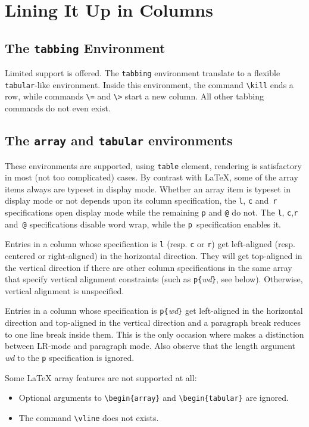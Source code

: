 \section{Lining It Up in Columns}
\subsection{The \protect\texttt{tabbing} Environment}
Limited support is offered.
The \texttt{tabbing} environment translate to a flexible \texttt{tabular}-like
environment.
Inside this environment, the command \verb+\kill+ ends a row, while
commands
\verb+\=+ and \verb+\>+ start a new column.
All other tabbing commands do not even exist.

\subsection{The \texttt{array} and \texttt{tabular}
environments}\label{arraydef}

These environments are supported, using \html{}
\verb+table+ element, rendering is satisfactory in most (not too
complicated) cases.
By contrast with \LaTeX{},
some of the array items always are typeset in display mode.
Whether an array item is typeset in display mode or not depends upon
its column specification,
the \verb+l+, \verb+c+ and~\verb+r+ specifications open display mode
while the remaining \verb+p+ and \verb+@+ do not.
The \verb+l+, \verb+c+,\verb+r+ and~\verb+@+ specifications
disable word wrap, while the \verb+p+~specification enables it.

Entries in a column whose specification is \verb+l+ (resp. \verb+c+ or
\verb+r+) get left-aligned (resp. centered or right-aligned)
in the horizontal direction.
They will get top-aligned in the vertical direction if there are
other column specifications in the
same array that specify vertical alignment constraints
(such as \verb+p{+\textit{wd}\verb+}+, see below).
Otherwise, vertical alignment is unspecified.

Entries in a column whose specification is \verb+p{+{\it wd}\verb+}+
get left-aligned in the horizontal direction and
top-aligned in the vertical direction
and a paragraph break reduces to one line break inside them.
This is the only occasion where
\hevea{} makes a distinction between LR-mode and paragraph mode.
Also observe that the length argument \textit{wd} to the \verb+p+
specification is ignored.


Some \LaTeX{} array features are not supported at all:
\begin{itemize}
\item Optional arguments to \verb+\begin{array}+ and
\verb+\begin{tabular}+ are ignored.
\item The command \verb+\vline+ does not exists.
\end{itemize}

